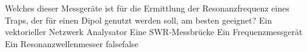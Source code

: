     {Welches dieser Messgeräte ist für die Ermittlung der Resonanzfrequenz eines Traps, der für einen Dipol genutzt werden soll, am besten geeignet?}
    {Ein vektorieller Netzwerk Analysator}
    {Eine SWR-Messbrücke}
    {Ein Frequenzmessgerät}
    {Ein Resonanzwellenmesser}
    {false}{false}